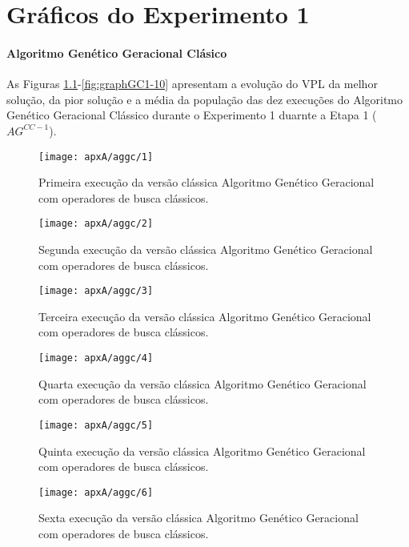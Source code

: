 \chapter{Gráficos do Experimento 1}

\subsubsection{Algoritmo Genético Geracional Clásico}
As Figuras \ref{fig:graphGC1-01}-\ref{fig:graphGC1-10} apresentam a evolução do VPL da melhor solução, da pior solução e a média da população das dez execuções do Algoritmo Genético Geracional Clássico durante o Experimento 1 duarnte a Etapa 1 ($AG^{CC-1}$).

\begin{figure}[H]
\centering
\texttt{[image: apxA/aggc/1]}
\caption{Primeira execução da versão clássica Algoritmo Genético Geracional com operadores de busca clássicos.}
\label{fig:graphGC1-01}
\end{figure}

\begin{figure}[H]
\centering
\texttt{[image: apxA/aggc/2]}
\caption{Segunda execução da versão clássica Algoritmo Genético Geracional com operadores de busca clássicos.}
\label{fig:graphGC1-03}
\end{figure}

\begin{figure}[H]
\centering
\texttt{[image: apxA/aggc/3]}
\caption{Terceira execução da versão clássica Algoritmo Genético Geracional com operadores de busca clássicos.}
\label{fig:graphGC1-03}
\end{figure}

\begin{figure}[H]
\centering
\texttt{[image: apxA/aggc/4]}
\caption{Quarta execução da versão clássica Algoritmo Genético Geracional com operadores de busca clássicos.}
\label{fig:graphGC1-04}
\end{figure}


\begin{figure}[htb]
\centering
\texttt{[image: apxA/aggc/5]}
\caption{Quinta execução da versão clássica Algoritmo Genético Geracional com operadores de busca clássicos.}
\label{fig:graphGC1-05}
\end{figure}


\begin{figure}[H]
\centering
\texttt{[image: apxA/aggc/6]}
\caption{Sexta execução da versão clássica Algoritmo Genético Geracional com operadores de busca clássicos.}
\label{fig:graphGC1-06}
\end{figure}

